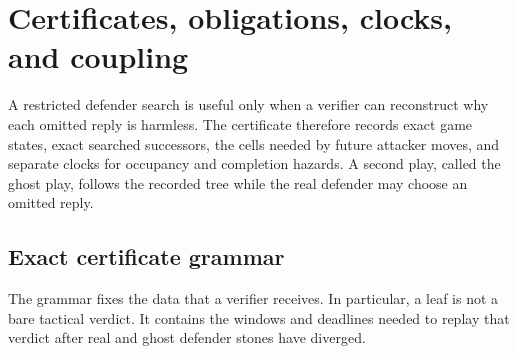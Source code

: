 \section{Certificates, obligations, clocks, and coupling}
\label{sec:certificates}

A restricted defender search is useful only when a verifier can reconstruct
why each omitted reply is harmless.  The certificate therefore records exact
game states, exact searched successors, the cells needed by future attacker
moves, and separate clocks for occupancy and completion hazards.  A second
play, called the ghost play, follows the recorded tree while the real defender
may choose an omitted reply.

\subsection{Exact certificate grammar}

The grammar fixes the data that a verifier receives.  In particular, a leaf
is not a bare tactical verdict.  It contains the windows and deadlines needed
to replay that verdict after real and ghost defender stones have diverged.

